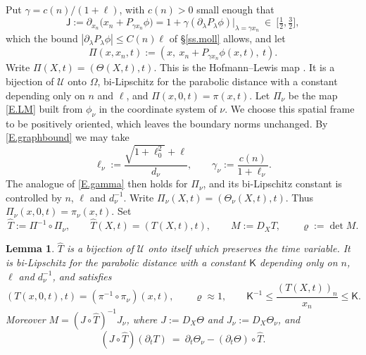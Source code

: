 \documentclass[12pt,leqno]{amsart}
\numberwithin{equation}{section}
\newcommand{\abs}[1]{\left\vert#1\right\vert}
\newcommand{\br}[1]{\left(#1\right)}
\newcommand{\om}{\Omega}
\newcommand{\pd}{\partial}
\newcommand{\Uc}{\mathcal U}
\theoremstyle{plain}
\newtheorem{lemma}[equation]{Lemma}
\theoremstyle{remark}
\begin{document}
Put $\gamma=c(n)/(1+\ell)$, with $c(n)>0$ small enough that
\begin{equation}\label{E.gamma}
  \mathsf J:=\pd_{x_n}\Big(x_n+P_{\gamma x_n}\phi\Big)
   =1+\gamma\br{\pd_\lambda P_\lambda\phi}\big|_{\lambda=\gamma x_n}
  \ \in\ \big[\tfrac12,\tfrac32\big] ,
\end{equation}
which the bound $\abs{\pd_\lambda P_\lambda\phi}\le C(n)\ell$ of
\S\ref{ss.moll} allows, and let
\begin{equation}\label{E.LM}
  \Pi(x,x_n,t):=\br{x,\ x_n+P_{\gamma x_n}\phi(x,t),\ t} .
\end{equation}
Write $\Pi(X,t)=(\Theta(X,t),t)$. This is the Hofmann--Lewis map
\cite[(1.6)]{HLmem}. It is a bijection of $\Uc$ onto $\om$, bi-Lipschitz
for the parabolic distance with a constant depending only on $n$ and $\ell$, and
$\Pi(x,0,t)=\pi(x,t)$. Let $\Pi_\nu$ be the map \eqref{E.LM} built from
$\phi_\nu$ in the coordinate system of $\nu$. We choose this spatial frame
to be positively oriented, which leaves the boundary norms unchanged.
By \eqref{E.graphbound} we may take
\[
 \ell_\nu:=\frac{\sqrt{1+\ell_0^2}+\ell}{d_\nu},\qquad
 \gamma_\nu:=\frac{c(n)}{1+\ell_\nu}.
\]
The analogue of \eqref{E.gamma} then holds for $\Pi_\nu$, and its
bi-Lipschitz constant is controlled by $n$, $\ell$ and $d_\nu^{-1}$.
Write $\Pi_\nu(X,t)=(\Theta_\nu(X,t),t)$. Thus
$\Pi_\nu(x,0,t)=\pi_\nu(x,t)$. Set
\begin{equation}\label{E.T}
  \widehat T:=\Pi^{-1}\circ\Pi_\nu,\qquad
  \widehat T(X,t)=\br{T(X,t),t},\qquad
  M:=D_XT,\qquad \varrho:=\det M .
\end{equation}

\begin{lemma}\label{L.T}
$\widehat T$ is a bijection of $\Uc$ onto itself which preserves the time
variable. It is
bi-Lipschitz for the parabolic distance with a constant $\mathsf K$ depending
only on $n$, $\ell$ and $d_\nu^{-1}$, and satisfies
\begin{equation}\label{E.Tbdry}
  \br{T(x,0,t),t}=\br{\pi^{-1}\circ\pi_\nu}(x,t),\qquad
  \varrho\approx1,\qquad
  \mathsf K^{-1}\le\frac{(T(X,t))_n}{x_n}\le\mathsf K .
\end{equation}
Moreover $M=\br{J\circ\widehat T}^{-1}J_\nu$, where
$J:=D_X\Theta$ and $J_\nu:=D_X\Theta_\nu$, and
\begin{equation}\label{E.dtT}
  \br{J\circ\widehat T}\br{\pd_tT}
  \ =\ \pd_t\Theta_\nu-\br{\pd_t\Theta}\circ\widehat T .
\end{equation}
\end{lemma}
\end{document}
